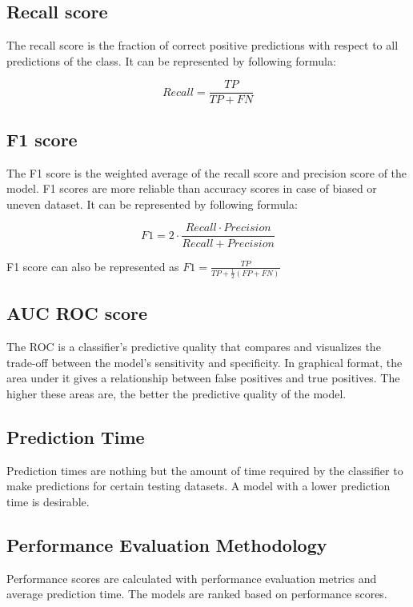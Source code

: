 \subsection{Recall score}\label{subsec:recall_score}
The recall score is the fraction of correct positive predictions with respect to all
predictions of the class. It can be represented by following formula:

\begin{equation}\label{eq:recall_score}
    Recall = \frac{TP}{TP+FN}
\end{equation}

\subsection{F1 score}\label{subsec:f1_score}
The F1 score is the weighted average of the recall score and precision score of the model. F1
scores are more reliable than accuracy scores in case of biased or uneven dataset. It can be
represented by following formula:

\begin{equation}\label{eq:f1_score}
    F1 = 2 \cdot \frac{Recall \cdot Precision}{Recall + Precision}
\end{equation}

F1 score can also be represented as
$F1 = \frac{TP}{TP+\frac{1}{2}(FP+FN)}$

\subsection{AUC ROC score}\label{subsec:auc_roc_score}
The ROC is a classifier's predictive quality that compares and visualizes the trade-off between
the model's sensitivity and specificity. In graphical format, the area under it gives a
relationship between false positives and true positives. The higher these areas are, the better
the predictive quality of the model.

\subsection{Prediction Time}\label{subsec:prediction_time}
Prediction times are nothing but the amount of time required by the classifier to make
predictions for certain testing datasets. A model with a lower prediction time is desirable.

\subsection{Performance Evaluation Methodology} \label{subsec:performance_evaluation_methodology}
Performance scores are calculated with performance evaluation metrics and average prediction
time. The models are ranked based on performance scores.

